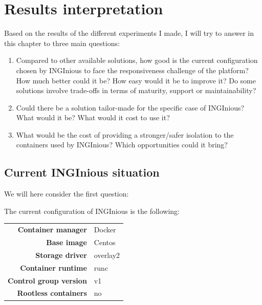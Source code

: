 \chapter{Results interpretation}

Based on the results of the different experiments I made, I will try to answer in this chapter to three main questions:
\begin{enumerate}
  \item Compared to other available solutions, how good is the current configuration chosen by INGInious to face the responsiveness challenge of the platform?  How much better could it be?  How easy would it be to improve it?  Do some solutions involve trade-offs in terms of maturity, support or maintainability?
  \item Could there be a solution tailor-made for the specific case of INGInious?  What would it be?  What would it cost to use it?
  \item What would be the cost of providing a stronger/safer isolation to the containers used by INGInious?  Which opportunities could it bring?
\end{enumerate}

\section{Current INGInious situation}
We will here consider the first question:
\begin{center}
\end{center}

The current configuration of INGInious is the following:
\begin{center}
\begin{tabular}{rl}
  \textbf{Container manager} & Docker \\
  \textbf{Base image} & Centos \\
  \textbf{Storage driver} & overlay2 \\
  \textbf{Container runtime} & runc \\
  \textbf{Control group version} & v1 \\
  \textbf{Rootless containers} & no \\
\end{tabular}
\end{center}

